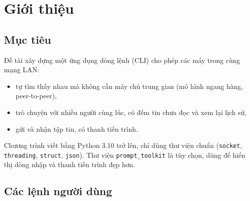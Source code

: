 \documentclass[a4paper,12pt]{article}
\newcommand{\code}[1]{\texttt{#1}}
\begin{document}
	\clearpage
	\tableofcontents
	\clearpage
	\listoffigures
	\listoftables
	\clearpage
	
	\section{Giới thiệu}
	
	\subsection{Mục tiêu}
	Đề tài xây dựng một ứng dụng dòng lệnh (CLI) cho phép các máy trong cùng mạng LAN:
	\begin{itemize}
		\item tự tìm thấy nhau mà không cần máy chủ trung gian (mô hình ngang hàng, peer-to-peer),
		\item trò chuyện với nhiều người cùng lúc, có đếm tin chưa đọc và xem lại lịch sử,
		\item gửi và nhận tập tin, có thanh tiến trình.
	\end{itemize}
	Chương trình viết bằng Python 3.10 trở lên, chỉ dùng thư viện chuẩn (\code{socket}, \code{threading}, \code{struct}, \code{json}). Thư viện \code{prompt\_toolkit} là tùy chọn, dùng để hiển thị dòng nhập và thanh tiến trình đẹp hơn.
	
	\subsection{Các lệnh người dùng}
	
\end{document}
